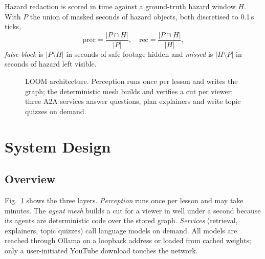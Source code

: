 \documentclass[conference,a4paper]{IEEEtran}
\newcommand{\fig}[1]{Fig.~\ref{#1}}
\begin{document}
Hazard redaction is scored in time against a ground-truth hazard window $H$. With $P$ the union of masked seconds of
hazard objects, both discretised to 0.1\,s ticks,
\begin{equation}
\mathrm{prec}=\frac{|P\cap H|}{|P|},\quad \mathrm{rec}=\frac{|P\cap H|}{|H|},
\end{equation}
\emph{false-block} is $|P\setminus H|$ in seconds of safe footage hidden and \emph{missed} is $|H\setminus P|$ in seconds
of hazard left visible.

\begin{figure}[t]
\centering
\resizebox{\textwidth}{!}{}
\caption{LOOM architecture. Perception runs once per lesson and writes the graph; the deterministic mesh builds and
verifies a cut per viewer; three A2A services answer questions, plan explainers and write topic quizzes on demand.}
\label{fig:arch}
\end{figure}

\section{System Design}
\subsection{Overview}
\fig{fig:arch} shows the three layers. \emph{Perception} runs once per lesson and may take minutes. The \emph{agent
mesh} builds a cut for a viewer in well under a second because its agents are deterministic code over the stored
graph. \emph{Services} (retrieval, explainers, topic quizzes) call language models on demand. All models are reached
through Ollama on a loopback address or loaded from cached weights; only a user-initiated YouTube download touches the
network.
\end{document}
